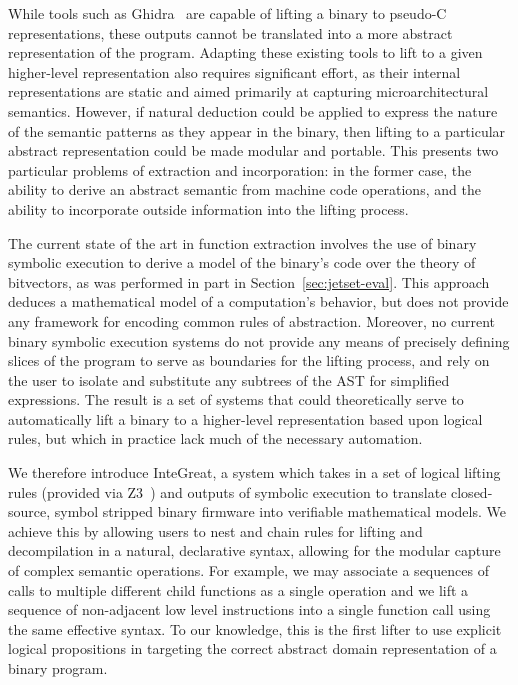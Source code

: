 While tools such as Ghidra~\cite{eagle2020ghidra} are capable of lifting a binary to pseudo-C representations, these outputs cannot be translated into a more abstract representation of the program.
Adapting these existing tools to lift to a given higher-level representation also requires significant effort, as their internal representations are static and aimed primarily at capturing microarchitectural semantics.
However, if natural deduction could be applied to express the nature of the semantic patterns as they appear in the binary, then lifting to a particular abstract representation could be made modular and portable.
This presents two particular problems of extraction and incorporation: in the former case, the ability to derive an abstract semantic from machine code operations, and the ability to incorporate outside information into the lifting process.

The current state of the art in function extraction involves the use of binary symbolic execution to derive a model of the binary's code over the theory of bitvectors, as was performed in part in Section~\ref{sec:jetset-eval}.
This approach deduces a mathematical model of a computation's behavior, but does not provide any framework for encoding common rules of abstraction.
Moreover, no current binary symbolic execution systems do not provide any means of precisely defining slices of the program to serve as boundaries for the lifting process, and rely on the user to isolate and substitute any subtrees of the AST for simplified expressions.
The result is a set of systems that could theoretically serve to automatically lift a binary to a higher-level representation based upon logical rules, but which in practice lack much of the necessary automation.

We therefore introduce InteGreat, a system which takes in a set of logical lifting rules (provided via Z3~\cite{zthree}) and outputs of symbolic execution to translate closed-source, symbol stripped binary firmware into verifiable mathematical models.
We achieve this by allowing users to nest and chain rules for lifting and decompilation in a natural, declarative syntax, allowing for the modular capture of complex semantic operations.
For example, we may associate a sequences of calls to multiple different child functions as a single operation and we lift a sequence of non-adjacent low level instructions into a single function call using the same effective syntax.
To our knowledge, this is the first lifter to use explicit logical propositions in targeting the correct abstract domain representation of a binary program.

